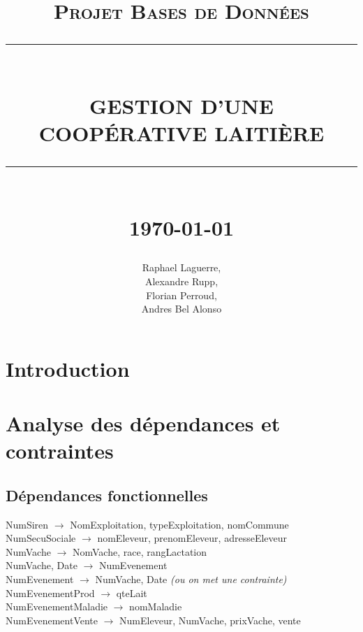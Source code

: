 \documentclass[12pt]{report}
\newcommand{\HRule}[1]{\rule{\linewidth}{#1}}
\begin{document}
\title{ \normalsize \textsc{Projet Bases de Données}
		\\ [2.0cm]
		\HRule{0.5pt} \\
		\LARGE \textbf{\uppercase{Gestion d'une coopérative laitière}}
		\HRule{2pt} \\ [0.5cm]
		\normalsize \today \vspace*{5\baselineskip}}

\date{}

\author{
		Raphael Laguerre,\\ Alexandre Rupp,\\ Florian Perroud,\\ Andres Bel Alonso }

\maketitle
\tableofcontents
\newpage

\sectionfont{\scshape}


\section*{Introduction}

\section{Analyse des dépendances et contraintes}
\subsection{Dépendances fonctionnelles}
\noindent
NumSiren $\rightarrow$ NomExploitation, typeExploitation, nomCommune \\
NumSecuSociale $\rightarrow$ nomEleveur, prenomEleveur, adresseEleveur \\
NumVache $\rightarrow$ NomVache, race, rangLactation \\
NumVache, Date $\rightarrow$ NumEvenement \\
NumEvenement $\rightarrow$ NumVache, Date \textit{(ou on met une contrainte)} \\
NumEvenementProd $\rightarrow$ qteLait \\
NumEvenementMaladie $\rightarrow$ nomMaladie \\
NumEvenementVente $\rightarrow$ NumEleveur, NumVache, prixVache, vente
\end{document}
